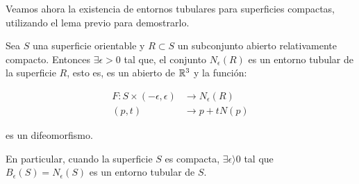 Veamos ahora la existencia de entornos tubulares para superficies compactas, utilizando el lema previo para demostrarlo.

\begin{theorem}
Sea $S$ una superficie orientable y $R \subset S$ un subconjunto abierto relativamente compacto. Entonces $\exists \epsilon > 0$ tal que, el conjunto $N_\epsilon(R)$ es un entorno tubular de la superficie $R$, esto es, es un abierto de $\mathbb{R}^3$ y la función:

\begin{align*}
    F: S \times (-\epsilon, \epsilon) &\longrightarrow N_\epsilon(R) \\
    (p,t) &\longrightarrow p + tN(p)
\end{align*}

es un difeomorfismo.

En particular, cuando la superficie $S$ es compacta, $\exists \epsilon  \rangle  0$ tal que
$B_\epsilon(S)=N_\epsilon(S)$ es un entorno tubular de $S$.
\end{theorem}
